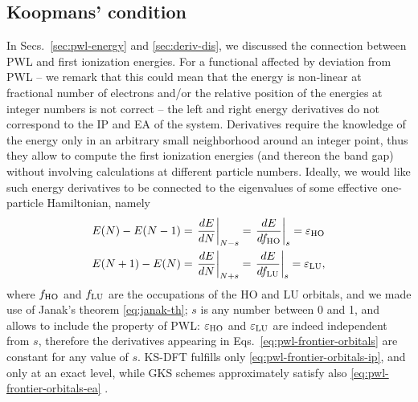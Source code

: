 \subsection{Koopmans' condition\label{sec:koopmans-condition}}
In Secs.~\ref{sec:pwl-energy} and \ref{sec:deriv-dis}, we discussed the connection between PWL and first ionization energies. For a functional affected by deviation from PWL -- we remark that this could mean that the energy is non-linear at fractional number of electrons and/or the relative position of the energies at integer numbers is not correct -- the left and right energy derivatives do not correspond to the IP and EA of the system. Derivatives require the knowledge of the energy only in an arbitrary small neighborhood around an integer point, thus they allow to compute the first ionization energies (and thereon the band gap) without involving calculations at different particle numbers. Ideally, we would like such energy derivatives to be connected to the eigenvalues of some effective one-particle Hamiltonian, namely
%
\begin{subequations}
    \begin{align}
        E(N) - E(N-1) &= \left. \frac{dE}{dN} \right|_{N-s} = \left. \frac{dE}{df_{\rm HO}} \right|_{s} = \varepsilon_{\rm HO} \label{eq:pwl-frontier-orbitals-ip}\\
        E(N+1) - E(N) &= \left. \frac{dE}{dN} \right|_{N+s} = \left. \frac{dE}{df_{\rm LU}} \right|_{s} = \varepsilon_{\rm LU} \label{eq:pwl-frontier-orbitals-ea},
    \end{align}
    \label{eq:pwl-frontier-orbitals}
\end{subequations}
%
where $f_{\rm HO}$ and $f_{\rm LU}$ are the occupations of the HO and LU orbitals, and we made use of Janak's theorem \eqref{eq:janak-th}; $s$ is any number between 0 and 1, and allows to include the property of PWL: $\varepsilon_{\rm HO}$ and $\varepsilon_{\rm LU}$ are indeed independent from $s$, therefore the derivatives appearing in Eqs.~\eqref{eq:pwl-frontier-orbitals} are constant for any value of $s$. KS-DFT fulfills only \cref{eq:pwl-frontier-orbitals-ip}, and only at an exact level, while GKS schemes approximately satisfy also \cref{eq:pwl-frontier-orbitals-ea} \cite{seidl_generalized_1996,cohen_fractional-charge_2008,stein_fundamental_2010}.

